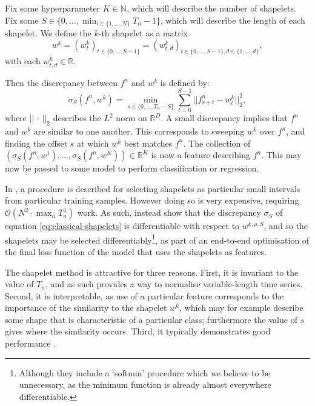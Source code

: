 \documentclass{article}
\theoremstyle{plain}
\theoremstyle{definition}
\newcommand{\reals}{\mathbb{R}}
\newcommand{\naturals}{\mathbb{N}}
\newcommand{\bigO}{\mathcal{O}}
\newcommand{\norm}[1]{\mathord|\!\mathord|#1\mathord|\!\mathord|} %
\begin{document}
	Fix some hyperparameter $K \in \naturals$, which will describe the number of shapelets. Fix some $S \in \{0, \ldots, \min_{i \in \{1, \ldots, N\}}T_n - 1\}$, which will describe the length of each shapelet. We define the $k$-th shapelet as a matrix
	\begin{equation*}
	w^{k} = (w^{k}_t)_{t \in \{0, \ldots, S - 1\}} = (w^{k}_{t, d})_{t \in \{0, \ldots, S - 1\}, d \in \{1, \ldots, d\}},
	\end{equation*}
	with each $w^{k}_{t, d} \in \reals$.
	
	Then the discrepancy between $f^n$ and $w^{k}$ is defined by:
	\begin{equation}\label{eq:classical-shapelets}
	\sigma_S(f^n, w^{k}) = \min_{s \in \{0, \ldots, T_n - S\}} \sum_{t = 0}^{S - 1} \norm{f^n_{s + t} - w^{k}_t}_2^2,
	\end{equation}
	where $\norm{\,\cdot\,}_2$ describes the $L^2$ norm on $\reals^D$. A small discrepancy implies that $f^n$ and $w^{k}$ are similar to one another. This corresponds to sweeping $w^{k}$ over $f^n$, and finding the offset $s$ at which $w^{k}$ best matches $f^n$. The collection of $(\sigma_S(f^n, w^{1}), \ldots, \sigma_S(f^n, w^{K})) \in \reals^K$ is now a feature describing $f^n$. This may now be passed to some model to perform classification or regression.
	
	In \cite{TODO}, a procedure is described for selecting shapelets as particular small intervals from particular training samples. However doing so is very expensive, requiring $\bigO(N^2 \cdot \max_n T_n^4)$ work. As such, \cite{TODO} instead show that the discrepancy $\sigma_S$ of equation \eqref{eq:classical-shapelets} is differentiable with respect to $w^{k, \rho, S}$, and so the shapelets may be selected differentiably\footnote{Although they include a `softmin' procedure which we believe to be unnecessary, as the minimum function is already almost everywhere differentiable.}, as part of an end-to-end optimisation of the final loss function of the model that uses the shapelets as features.
	
	The shapelet method is attractive for three reasons. First, it is invariant to the value of $T_n$, and as such provides a way to normalise variable-length time series. Second, it is interpretable, as use of a particular feature corresponds to the importance of the similarity to the shapelet $w^{k}$, which may for example describe some shape that is characteristic of a particular class; furthermore the value of $s$ gives where the similarity occurs. Third, it typically demonstrates good performance \cite{TODO}.
	
\end{document}
